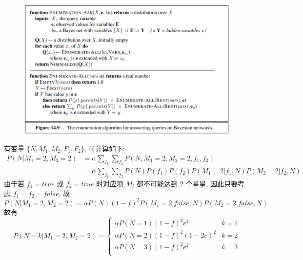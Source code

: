 \documentclass[UTF8]{article}
\newcommand{\jumpLine} {\hspace*{\fill} \par}
\begin{document}
\begin{figure}[H]
	\centering
	\includegraphics[width=\linewidth*2/3]{image/14.9.png}
\end{figure} \jumpLine\noindent
有变量 $\{N,M_1,M_2,F_1,F_2\}$, 可计算如下:
\begin{align*}
	P(N|M_1=2,M_2=2) &= \alpha\sum\limits_{f_1}\sum\limits_{f_2}P(N, M_1=2, M_2=2,f_1,f_2) \\
	&= \alpha\sum\limits_{f_1}\sum\limits_{f_2}P(N)P(f_1)P(f_2)P(M_1=2|f_1, N)P(M_2=2|f_2, N)
\end{align*}
由于若 $f_1=true$ 或 $f_2=true$ 时对应项 $M_i$ 都不可能达到 2 个星星, 因此只要考虑 $f_1=f_2=false$, 故
$$P(N|M_1=2,M_2=2) = \alpha P(N)(1-f)^2P(M_1=2|false,N)P(M_2=2|false,N)$$
故有 $$P(N=k|M_1=2,M_2=2)=\left\{
\begin{array}{ll}
	\alpha P(N=1)(1-f)^2e^2 & k=1 \\
	\alpha P(N=2)(1-f)^2(1-2e)^2 & k=2 \\
	\alpha P(N=3)(1-f)^2e^2 & k=3 \\
\end{array}
\right.$$
\end{document}

